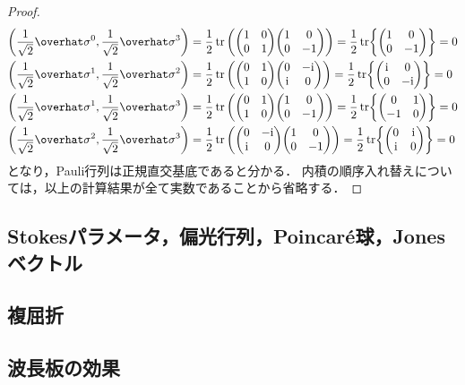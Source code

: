 \documentclass{report}
\begin{document}
$$\begin{proof}
\begin{align}
        \qty(\frac{1}{\sqrt{2}}\hat{\sigma}^0, \frac{1}{\sqrt{2}}\hat{\sigma}^3) &= \frac{1}{2}\tr\qty(\mqty(1 & 0 \\ 0 & 1)\mqty(1 & 0 \\ 0 & -1)) = \frac{1}{2}\tr{\mqty(1 & 0 \\ 0 & -1)} = 0 \\
        \qty(\frac{1}{\sqrt{2}}\hat{\sigma}^1, \frac{1}{\sqrt{2}}\hat{\sigma}^2) &= \frac{1}{2}\tr\qty(\mqty(0 & 1 \\ 1 & 0)\mqty(0 & -\i \\ \i & 0)) = \frac{1}{2}\tr{\mqty(\i & 0 \\ 0 & -\i)} = 0 \\ 
        \qty(\frac{1}{\sqrt{2}}\hat{\sigma}^1, \frac{1}{\sqrt{2}}\hat{\sigma}^3) &= \frac{1}{2}\tr\qty(\mqty(0 & 1 \\ 1 & 0)\mqty(1 & 0 \\ 0 & -1)) = \frac{1}{2}\tr{\mqty(0 & 1 \\ -1 & 0)} = 0 \\ 
        \qty(\frac{1}{\sqrt{2}}\hat{\sigma}^2, \frac{1}{\sqrt{2}}\hat{\sigma}^3) &= \frac{1}{2}\tr\qty(\mqty(0 & -\i \\ \i & 0)\mqty(1 & 0 \\ 0 & -1)) = \frac{1}{2}\tr{\mqty(0 & \i \\ \i & 0)} = 0 
      \end{align}
      となり，Pauli行列は正規直交基底であると分かる．
      内積の順序入れ替えについては，以上の計算結果が全て実数であることから省略する．
    \end{proof}
  \subsection{Stokesパラメータ，偏光行列，Poincar\'e球，Jonesベクトル}
  \subsection{複屈折}
  \subsection{波長板の効果}
\end{document}
